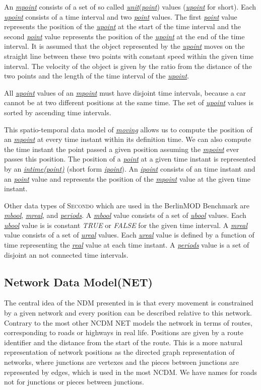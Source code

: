 \documentclass[a4paper]{article}
\newcommand{\secondo}{\textsc{Secondo}}
\newcommand{\bmodb} {BerlinMOD Benchmark}
\newcommand{\dt}[1]{\textsl{\underline{#1}}}
\newcommand{\true}{\textsl{TRUE}}
\newcommand{\false}{\textsl{FALSE}}
\begin{document}
An \dt{mpoint} consists of a set of so called \dt{unit}(\dt{point}) values
(\dt{upoint} for short).
Each \dt{upoint} consists of a time interval and two \dt{point} values. The first
\dt{point} value represents the position of the \dt{upoint} at the start of the
time interval and the second \dt{point} value represents the position of the
\dt{upoint} at the end of the time interval. It is assumed that the object 
represented
by the \dt{upoint} moves on the straight line between these two points with constant
speed within the given time interval. The velocity of the object is given by the
ratio from the distance of the two points and the length of the time interval of
the \dt{upoint}.

All \dt{upoint} values of an \dt{mpoint} must have disjoint time intervals,
because a car cannot be at two different positions at the same time.
The set of \dt{upoint} values is sorted by ascending time intervals.

This spatio-temporal data model of \dt{moving} allows us to compute the position
of an \dt{mpoint} at every time instant within its definition time.
We can also compute the time instant the point passed a
given position assuming the \dt{mpoint} ever passes this position. The position of a
\dt{point} at a given time instant is represented by an \dt{intime(point)}
(short form \dt{ipoint}). An \dt{ipoint} consists of an time instant and an 
\dt{point}
value and represents the position of the \dt{mpoint} value at the given time 
instant.

Other data types of \secondo{} which are used in the \bmodb{} are \dt{mbool},
\dt{mreal}, and \dt{periods}. A \dt{mbool} value consists of a set of \dt{ubool}
values. Each \dt{ubool} value is is constant \true{} or \false{} for the given
time interval. A \dt{mreal} value consists of a set of \dt{ureal} values. Each
\dt{ureal} value is defined by a function of time representing the \dt{real}
value at each time instant. A \dt{periods} value is a set of disjoint an not
connected time intervals.
\subsection{Network Data Model(NET)}
\label{sec:netdatamod}
The central idea of the NDM presented in \cite{NetworkGueting} is that
every movement is constrained by a given network and every position can be described
relative to this network. Contrary to the most other NCDM NET models the network
in terms of routes, corresponding to roads or highways in real life. Positions
are given by a route identifier and the distance from the start of the route.
This is a more natural representation of network positions as the directed graph
representation of networks, where junctions are vertexes and the pieces between
junctions are represented by edges, which is used in the most NCDM. We have names
for roads not for junctions or pieces between junctions.
\end{document}
